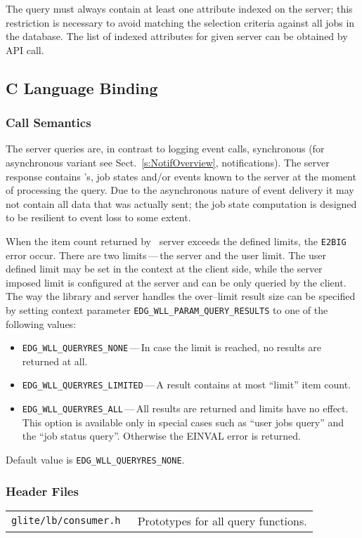 %
The query must always contain at least one attribute indexed
on the \LB server; this restriction is necessary to avoid matching the
selection criteria against all jobs in the \LB database. The list of
indexed attributes for given \LB server can be obtained by \LB API
call.

\subsection{C Language Binding}

\subsubsection{Call Semantics}
The \LB server queries are, in contrast to logging event calls,
synchronous (for asynchronous variant see Sect.~\ref{s:NotifOverview},
notifications). The server response contains \jobid's, job states
and/or events known to the server at the moment of processing the
query. Due to the asynchronous nature of event delivery it may not
contain all data that was actually sent; the job state computation is
designed to be resilient to event loss to some extent.

%
When the item count returned by \LB\ server exceeds the defined
limits, the \verb'E2BIG' error occur. There are two limits\,---\,the server
and the user limit. The user defined limit may be set in the context
at the client side, while the server imposed limit is configured at
the server and can be only queried by the client. The way the \LB
library and server handles the over--limit result size can be
specified by setting context parameter
\verb'EDG_WLL_PARAM_QUERY_RESULTS' to one of the following values:
\begin{itemize}
\item \verb'EDG_WLL_QUERYRES_NONE'\,---\,In case the limit is reached,
no results are returned at all.
\item \verb'EDG_WLL_QUERYRES_LIMITED'\,---\,A result contains at most
``limit'' item count. 
\item \verb'EDG_WLL_QUERYRES_ALL'\,---\,All results are returned and
limits have no effect. This option is available only in special cases
such as ``user jobs query'' and  the ``job status query''. Otherwise
the EINVAL error is returned. 
\end{itemize}
Default value is \verb'EDG_WLL_QUERYRES_NONE'.


\subsubsection{Header Files}
\begin{table}[h]
\begin{tabularx}{\textwidth}{>{\tt}lX}
glite/lb/consumer.h & Prototypes for all query functions. \\
\end{tabularx}
\end{table}

